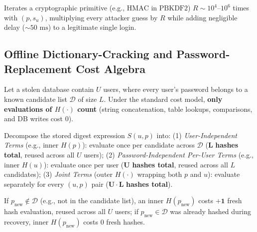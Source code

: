 \begin{compactitem}
\begin{compactitem}
    \item {} Iterates a cryptographic primitive (e.g., $\mathrm{HMAC}$ in $\mathrm{PBKDF2}$) $R \sim 10^4\text{--}10^6$ times with $(p, s_u)$, multiplying every attacker guess by $R$ while adding negligible delay ($\sim 50\text{ ms}$) to a legitimate single login.
  \end{compactitem}
\end{compactitem}

\subsection{Offline Dictionary-Cracking and Password-Replacement Cost Algebra}
Let a stolen database contain $U$ users, where every user's password belongs to a known candidate list $\mathcal{D}$ of size $L$. Under the standard cost model, \textbf{only evaluations of $H(\cdot)$ count} (string concatenation, table lookups, comparisons, and DB writes cost $0$).
\begin{compactitem}
  \item {} Decompose the stored digest expression $S(u, p)$ into: (1) \emph{User-Independent Terms} (e.g., inner $H(p)$): evaluate once per candidate across $\mathcal{D}$ ($\mathbf{L}$ \textbf{hashes total}, reused across all $U$ users); (2) \emph{Password-Independent Per-User Terms} (e.g., inner $H(u)$): evaluate once per user ($\mathbf{U}$ \textbf{hashes total}, reused across all $L$ candidates); (3) \emph{Joint Terms} (outer $H(\cdot)$ wrapping both $p$ and $u$): evaluate separately for every $(u, p)$ pair ($\mathbf{U \cdot L}$ \textbf{hashes total}).
  \item {} If $p_{\text{new}} \notin \mathcal{D}$ (e.g.,  not in the candidate list), an inner $H(p_{\text{new}})$ costs $\mathbf{+1}$ fresh hash evaluation, reused across all $U$ users; if $p_{\text{new}} \in \mathcal{D}$ was already hashed during recovery, inner $H(p_{\text{new}})$ costs $0$ fresh hashes.
\end{compactitem}

